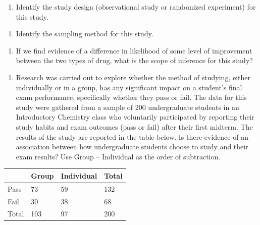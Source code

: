 \documentclass[
]{report}
\newcounter{none} %
\providecommand{\tightlist}{%
  \setlength{\itemsep}{0pt}\setlength{\parskip}{0pt}}
\begin{document}
\begin{enumerate}
\def\labelenumi{\alph{enumi}.}
\setcounter{enumi}{1}
\tightlist
\item
  Identify the study design (observational study or randomized experiment) for this study.
\end{enumerate}

\vspace{0.4in}

\begin{enumerate}
\def\labelenumi{\alph{enumi}.}
\setcounter{enumi}{2}
\tightlist
\item
  Identify the sampling method for this study.
\end{enumerate}

\vspace{0.4in}

\begin{enumerate}
\def\labelenumi{\alph{enumi}.}
\setcounter{enumi}{3}
\tightlist
\item
  If we find evidence of a difference in likelihood of some level of improvement between the two types of drug, what is the scope of inference for this study?
\end{enumerate}

\vspace{0.8in}

\begin{enumerate}
\def\labelenumi{\arabic{enumi}.}
\setcounter{enumi}{1}
\tightlist
\item
  Research was carried out to explore whether the method of studying, either individually or in a group, has any significant impact on a student's final exam performance, specifically whether they pass or fail. The data for this study were gathered from a sample of 200 undergraduate students in an Introductory Chemistry class who voluntarily participated by reporting their study habits and exam outcomes (pass or fail) after their first midterm. The results of the study are reported in the table below. Is there evidence of an association between how undergraduate students choose to study and their exam results? Use Group -- Individual as the order of subtraction.
\end{enumerate}

{\def\LTcaptype{none} %
\begin{longtable}[]{@{}llll@{}}
\toprule\noalign{}
& Group & Individual & Total \\
\midrule\noalign{}
\endhead
\bottomrule\noalign{}
\endlastfoot
Pass & 73 & 59 & 132 \\
Fail & 30 & 38 & 68 \\
Total & 103 & 97 & 200 \\
\end{longtable}
}
\end{document}
